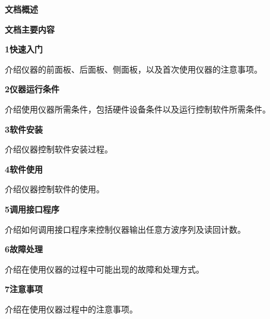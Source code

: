 \newpage
\noindent\xiaoer\textbf{文档概述}
\vspace{1.3cm}

\noindent\sanhao\textbf{文档主要内容}
\vspace{0.7cm}

\noindent\xiaosi\textbf{1\quad 快速入门}
\vspace{0.4cm}

\song 介绍仪器的前面板、后面板、侧面板，以及首次使用仪器的注意事项。
\vspace{0.9cm}

\noindent\xiaosi\textbf{2\quad 仪器运行条件}
\vspace{0.4cm}

\song 介绍使用仪器所需条件，包括硬件设备条件以及运行控制软件所需条件。
\vspace{0.9cm}

\noindent\xiaosi\textbf{3\quad 软件安装}
\vspace{0.4cm}

\song 介绍仪器控制软件安装过程。
\vspace{0.9cm}

\noindent\xiaosi\textbf{4\quad 软件使用}
\vspace{0.4cm}

\song 介绍仪器控制软件的使用。
\vspace{0.9cm}

\noindent\xiaosi\textbf{5\quad 调用接口程序}
\vspace{0.4cm}

\song 介绍如何调用接口程序来控制仪器输出任意方波序列及读回计数。
\vspace{0.9cm}

\noindent\xiaosi\textbf{6\quad 故障处理}
\vspace{0.4cm}

\song 介绍在使用仪器的过程中可能出现的故障和处理方式。
\vspace{0.9cm}

\noindent\xiaosi\textbf{7\quad 注意事项}
\vspace{0.4cm}

\song 介绍在使用仪器过程中的注意事项。
